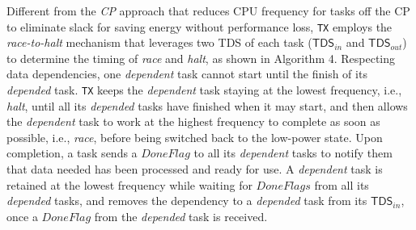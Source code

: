 \documentclass[12pt]{elsarticle}
\begin{document}
Different from the \emph{CP} approach that reduces CPU frequency for tasks off the CP to eliminate slack for saving energy without performance loss, \texttt{TX} employs the \emph{race-to-halt} mechanism that leverages two TDS of each task ($\mathsf{TDS}_{in}$ and $\mathsf{TDS}_{out}$) to determine the timing of \emph{race} and \emph{halt}, as shown in Algorithm 4. Respecting data dependencies, one \emph{dependent} task cannot start until the finish of its \emph{depended} task. \texttt{TX} keeps the \emph{dependent} task staying at the lowest frequency, i.e., \emph{halt}, until all its \emph{depended} tasks have finished when it may start, and then allows the \emph{dependent} task to work at the highest frequency to complete as soon as possible, i.e., \emph{race}, before being switched back to the low-power state. Upon completion, a task sends a $DoneFlag$ to all its \emph{dependent} tasks to notify them that data needed has been processed and ready for use. A \emph{dependent} task is retained at the lowest frequency while waiting for $DoneFlags$ from all its \emph{depended} tasks, and removes the dependency to a \emph{depended} task from its $\mathsf{TDS}_{in}$, once a $DoneFlag$ from the \emph{depended} task is received.
\end{document}
